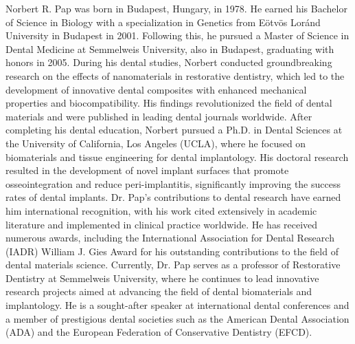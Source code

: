 \documentclass[journal,twoside,web]{ieeecolor}
\begin{document}
\begin{IEEEbiography}{Norbert R. Pap} was born in Budapest, Hungary, in 1978. He earned his Bachelor of Science in Biology with a specialization in Genetics from Eötvös Loránd University in Budapest in 2001. Following this, he pursued a Master of Science in Dental Medicine at Semmelweis University, also in Budapest, graduating with honors in 2005.
    During his dental studies, Norbert conducted groundbreaking research on the effects of nanomaterials in restorative dentistry, which led to the development of innovative dental composites with enhanced mechanical properties and biocompatibility. His findings revolutionized the field of dental materials and were published in leading dental journals worldwide.
    After completing his dental education, Norbert pursued a Ph.D. in Dental Sciences at the University of California, Los Angeles (UCLA), where he focused on biomaterials and tissue engineering for dental implantology. His doctoral research resulted in the development of novel implant surfaces that promote osseointegration and reduce peri-implantitis, significantly improving the success rates of dental implants.
    Dr. Pap's contributions to dental research have earned him international recognition, with his work cited extensively in academic literature and implemented in clinical practice worldwide. He has received numerous awards, including the International Association for Dental Research (IADR) William J. Gies Award for his outstanding contributions to the field of dental materials science.
    Currently, Dr. Pap serves as a professor of Restorative Dentistry at Semmelweis University, where he continues to lead innovative research projects aimed at advancing the field of dental biomaterials and implantology. He is a sought-after speaker at international dental conferences and a member of prestigious dental societies such as the American Dental Association (ADA) and the European Federation of Conservative Dentistry (EFCD).
\end{IEEEbiography}
\end{document}
